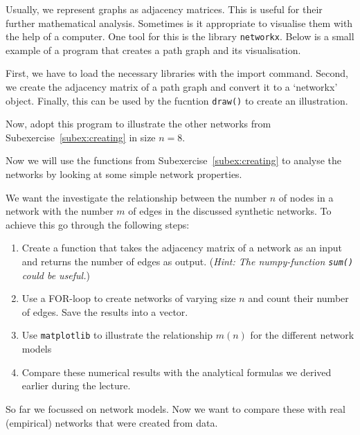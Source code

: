 \exercise[%
  topic=Illustrate Graphs with Python
    ]


Usually, we represent graphs as adjacency matrices. This is useful for their further mathematical analysis. Sometimes is it appropriate to visualise them with the help of a computer. One tool for this is the library {\tt networkx}. Below is a small example of a program that creates a path graph and its visualisation.



First, we have to load the necessary libraries with the {\sc import}
command. Second, we create the adjacency matrix of a path graph and
convert it to a `networkx' object. Finally, this can be used by the
fucntion {\tt draw()}  to create an illustration.

Now, adopt this program to illustrate the other networks from Subexercise~\ref{subex:creating} in size $n=8$.

  \exercise[%
  topic=Investigating Graphs with Python
    ]
Now we will use the functions from Subexercise~\ref{subex:creating} to analyse the networks by looking at some simple network properties.

 \subexercise[%
  topic=Counting Edges,
    ]

We want the investigate the relationship between the number $n$ of nodes in a network with the number $m$ of edges in the discussed synthetic networks. To achieve this go through the following steps:


\begin{enumerate}
\item Create a function that takes the adjacency matrix of a network as
    an input and returns the number of edges as output. (\emph{Hint: The numpy-function {\tt sum()} could be useful.})
\item Use a FOR-loop to create networks of varying size $n$ and count
    their number of edges. Save the results into a vector.
\item  Use {\tt matplotlib} to illustrate the relationship $m(n)$ for the different network models
\item Compare these numerical results with the analytical formulas we derived earlier during the lecture.
\end{enumerate}


 \subexercise[%
  topic=Comparing Synthetic with Empiric Networks,
    ]


So far we focussed on network models. Now we want to compare these with real (empirical) networks that were created from data.

